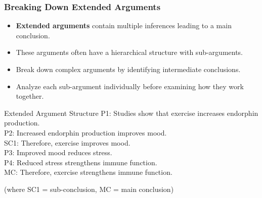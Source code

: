 \documentclass{beamer}
\begin{document}
\begin{frame}
    \frametitle{Breaking Down Extended Arguments}
    \begin{itemize}
        \item \textbf{Extended arguments} contain multiple inferences leading to a main conclusion.
        \item These arguments often have a hierarchical structure with sub-arguments.
        \item Break down complex arguments by identifying intermediate conclusions.
        \item Analyze each sub-argument individually before examining how they work together.
    \end{itemize}
    
    \begin{exampleblock}{Extended Argument Structure}
        P1: Studies show that exercise increases endorphin production.\\
        P2: Increased endorphin production improves mood.\\
        SC1: Therefore, exercise improves mood.\\
        
        P3: Improved mood reduces stress.\\
        P4: Reduced stress strengthens immune function.\\
        MC: Therefore, exercise strengthens immune function.
        
        (where SC1 = sub-conclusion, MC = main conclusion)
    \end{exampleblock}
\end{frame}
\end{document}
